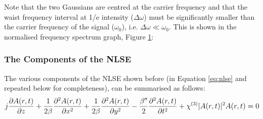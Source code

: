 \documentclass[colorlinks,11pt,a4paper,normalphoto,withhyper,ragged2e]{altareport}
\begin{document}
	\vspace{5mm}
	
	Note that the two Gaussians are centred at the carrier frequency and that the waist frequency interval at 1/e intensity ($\Delta\omega$) must be significantly smaller than the carrier frequency of the signal ($\omega_0$), i.e. ${\Delta\omega}\ll{\omega_0}$. This is shown in the normalised frequency spectrum graph, Figure \ref{fig:gaussian_spectrum_normalised}: \linebreak
	
	\begin{figure}[h]
		\centering
		\scalebox{0.85}{}
		\caption{}
		\label{fig:gaussian_spectrum_normalised}
	\end{figure}
	
	\pagebreak
	
	
	
	\subsubsection{The Components of the NLSE}
	
	The various components of the NLSE shown before (in Equation \ref{eq:nlse} and repeated below for completeness), can be summarised as follows:
	\begin{equation*}
       \mathlarger{ j \frac{\partial A(r,t)}{\partial z} + \frac{1}{2 \beta} \frac{\partial^2 A(r,t)}{\partial x^2} + \frac{1}{2 \beta} \frac{\partial^2 A(r,t)}{\partial y^2} - \frac{ \beta ''}{2} \frac{\partial^2 A(r,t)}{\partial t^2} + \chi^{(3)} |A(r,t)|^2 A(r,t) = 0 }
	\end{equation*}
	
\end{document}

